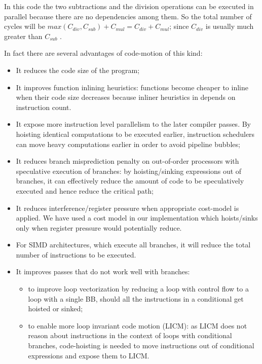 \documentclass[acmlarge,review]{acmart}\settopmatter{printfolios=true}
\begin{document}
In this code the two subtractions and the division operations can be executed in
parallel because there are no dependencies among them. So the total number of
cycles will be $max(C_{div}, C_{sub}) + C_{mul} = C_{div} + C_{mul}$; since $C_{div}$ is
usually much greater than $C_{sub}$ \cite{x86,aarch64}.


In fact there are several advantages of code-motion of this kind:
\begin{itemize}
\item It reduces the code size of the program;
\item It improves function inlining heuristics: functions become cheaper to
  inline when their code size decreases because inliner heuristics in \LLVM{}
  depends on instruction count.
\item It expose more instruction level parallelism to the later compiler
  passes. By hoisting identical computations to be executed earlier, instruction
  schedulers can move heavy computations earlier in order to avoid pipeline
  bubbles;
\item It reduces branch misprediction penalty on out-of-order processors with
  speculative execution of branches: by hoisting/sinking expressions out of
  branches, it can effectively reduce the amount of code to be speculatively
  executed and hence reduce the critical path;
\item It reduces interference/register pressure when appropriate cost-model is
  applied. We have used a cost model in our implementation which hoists/sinks only
  when register pressure would potentially reduce.
\item For SIMD architectures, which execute all branches, it will reduce the
  total number of instructions to be executed.
\item It improves passes that do not work well with branches:
  \begin{itemize}
  \item to improve loop vectorization by reducing a loop with control flow to a
    loop with a single BB, should all the instructions in a conditional get
    hoisted or sinked;
  \item to enable more loop invariant code motion (LICM): as LICM does not
    reason about instructions in the context of loops with conditional branches,
    code-hoisting is needed to move instructions out of conditional expressions
    and expose them to LICM.
  \end{itemize}
\end{itemize}
\end{document}
